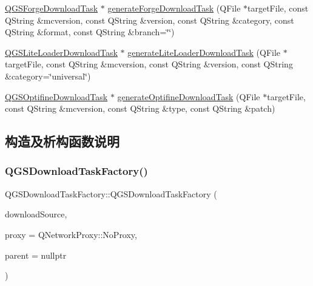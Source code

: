 \begin{DoxyCompactItemize}
\item 
\mbox{\hyperlink{class_q_g_s_forge_download_task}{Q\+G\+S\+Forge\+Download\+Task}} $\ast$ \mbox{\hyperlink{class_q_g_s_download_task_factory_a282bb3cede44407ba5b07c97ef3f6486}{generate\+Forge\+Download\+Task}} (Q\+File $\ast$target\+File, const Q\+String \&mcversion, const Q\+String \&version, const Q\+String \&category, const Q\+String \&format, const Q\+String \&branch=\char`\"{}\char`\"{})
\item 
\mbox{\hyperlink{class_q_g_s_lite_loader_download_task}{Q\+G\+S\+Lite\+Loader\+Download\+Task}} $\ast$ \mbox{\hyperlink{class_q_g_s_download_task_factory_a106703b80bbf6cc92047f8f8266fbf11}{generate\+Lite\+Loader\+Download\+Task}} (Q\+File $\ast$target\+File, const Q\+String \&mcversion, const Q\+String \&version, const Q\+String \&category=\char`\"{}universal\char`\"{})
\item 
\mbox{\hyperlink{class_q_g_s_optifine_download_task}{Q\+G\+S\+Optifine\+Download\+Task}} $\ast$ \mbox{\hyperlink{class_q_g_s_download_task_factory_a207b17ab07e710f7d4069fafda336ba2}{generate\+Optifine\+Download\+Task}} (Q\+File $\ast$target\+File, const Q\+String \&mcversion, const Q\+String \&type, const Q\+String \&patch)
\end{DoxyCompactItemize}


\subsection{构造及析构函数说明}
\mbox{\label{class_q_g_s_download_task_factory_a3f0ae57df533bb6ecff62c21483d4a7a}} 
\subsubsection{\texorpdfstring{Q\+G\+S\+Download\+Task\+Factory()}{QGSDownloadTaskFactory()}\hspace{0.1cm}{\footnotesize\ttfamily [1/3]}}
{\footnotesize\ttfamily Q\+G\+S\+Download\+Task\+Factory\+::\+Q\+G\+S\+Download\+Task\+Factory (\begin{DoxyParamCaption}\item[{\mbox{\hyperlink{class_q_g_s_i_download_source}{Q\+G\+S\+I\+Download\+Source}} $\ast$}]{download\+Source,  }\item[{const Q\+Network\+Proxy \&}]{proxy = {\ttfamily QNetworkProxy\+:\+:NoProxy},  }\item[{Q\+Object $\ast$}]{parent = {\ttfamily nullptr} }\end{DoxyParamCaption})}

